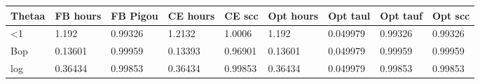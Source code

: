 \begin{tabular}{lllllllll}
Thetaa & FB hours & FB Pigou & CE hours & CE scc & Opt hours & Opt taul & Opt tauf & Opt scc \\ 
\hline 
<1 & 1.192 & 0.99326 & 1.2132 & 1.0006 & 1.192 & 0.049979 & 0.99326 & 0.99326 \\ 
Bop & 0.13601 & 0.99959 & 0.13393 & 0.96901 & 0.13601 & 0.049979 & 0.99959 & 0.99959 \\ 
log & 0.36434 & 0.99853 & 0.36434 & 0.99853 & 0.36434 & 0.049979 & 0.99853 & 0.99853 \\ 
\hline 
\end{tabular}